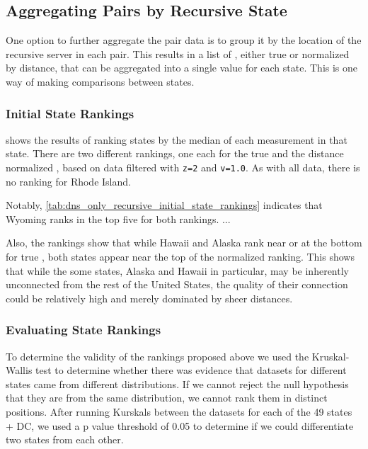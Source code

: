 \subsection{Aggregating Pairs by Recursive State}

One option to further aggregate the pair data is to group it by the location of the recursive server in each pair. This results in a list of \rtts, either true or normalized by distance, that can be aggregated into a single value for each state. This is one way of making comparisons between states.

\subsubsection{Initial State Rankings}

 shows the results of ranking states by the median of each measurement in that state. There are two different rankings, one each for the true \rtt and the distance normalized \rtt, based on data filtered with \texttt{z=2} and \texttt{v=1.0}. As with all \dns data, there is no ranking for Rhode Island.



Notably, \cref{tab:dns_only_recursive_initial_state_rankings} indicates that Wyoming ranks in the top five for both rankings. ...

Also, the rankings show that while Hawaii and Alaska rank near or at the bottom for true \rtt, both states appear near the top of the normalized ranking. This shows that while the some states, Alaska and Hawaii in particular, may be inherently unconnected from the rest of the United States, the quality of their connection could be relatively high and merely dominated by sheer distances.

\subsubsection{Evaluating State Rankings}

To determine the validity of the rankings proposed above we used the Kruskal-Wallis test to determine whether there was evidence that datasets for different states came from different distributions. If we cannot reject the null hypothesis that they are from the same distribution, we cannot rank them in distinct positions. After running Kurskals between the datasets for each of the 49 states + DC, we used a p value threshold of 0.05 to determine if we could differentiate two states from each other. 


